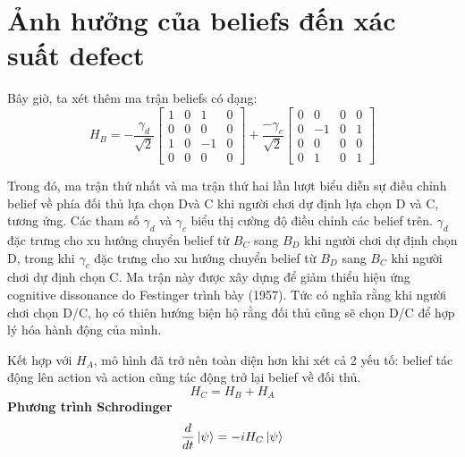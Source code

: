 \documentclass[12pt,a4paper]{article}
\newcommand{\de}[2]{%
\dfrac{d }{d {#1}} #2
%
}
\begin{document}
\section{Ảnh hưởng của beliefs đến xác suất defect}
Bây giờ, ta xét thêm ma trận beliefs có dạng:
\begin{equation}
    H_B = -\frac{\gamma_d}{\sqrt{2}} \begin{bmatrix}
        1&0&1&0\\0&0&0&0\\ 1&0&-1&0\\ 0&0&0&0
    \end{bmatrix} +\frac{-\gamma_c}{\sqrt{2}}\begin{bmatrix}
        0&0&0&0\\0&-1&0&1\\ 0&0&0&0\\ 0&1&0&1
    \end{bmatrix}
\end{equation}

Trong đó, ma trận thứ nhất và ma trận thứ hai lần lượt biểu diễn sự
điều chỉnh belief về phía đối thủ lựa chọn Dvà C khi người chơi
dự định lựa chọn D và C, tương ứng. Các tham số $\gamma_d$ và
$\gamma_c$ biểu thị cường độ điều chỉnh các belief trên. $\gamma_d$ đặc trưng cho xu hướng chuyển belief từ $B_C$ sang
$B_D$ khi người chơi dự định chọn D, trong khi $\gamma_c$ đặc
trưng cho xu hướng chuyển belief từ $B_D$ sang $B_C$ khi người chơi
dự định chọn C. Ma trận này được xây dựng để giảm thiểu hiệu ứng cognitive dissonance do Festinger trình bày (1957). Tức có nghĩa rằng khi người chơi chọn D/C, họ có thiên hướng biện hộ rằng đối thủ cũng sẽ chọn D/C để hợp lý hóa hành động của mình.

Kết hợp với $H_A$, mô hình đã trở nên toàn diện hơn khi xét cả 2 yếu tố: belief tác động lên action và action cũng tác động trở lại belief về đối thủ.
\begin{equation}
    H_C = H_B + H_A
\end{equation}
\textbf{Phương trình Schrodinger}
\begin{equation}
    \de{t}{\ket{\psi}} = -iH_C\ket{\psi}
\end{equation}
\end{document}
